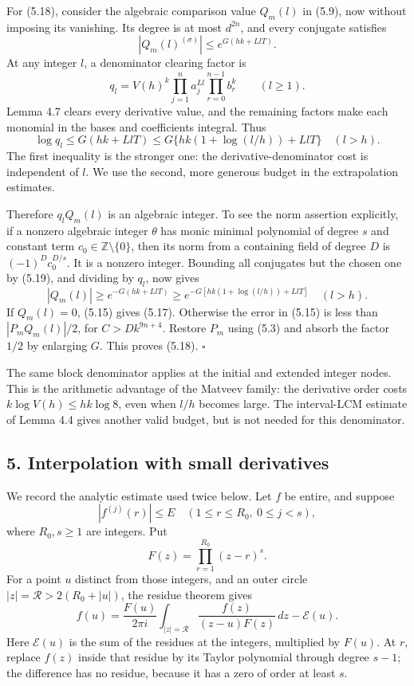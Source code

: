 \documentclass[
  11pt,
  a4paper,
]{article}
\begin{document}
For (5.18), consider the algebraic comparison value \(Q_m(l)\) in (5.9),
now without imposing its vanishing. Its degree is at most \(d^{2n}\),
and every conjugate satisfies \[
|Q_m(l)^{(\sigma)}|\le e^{G(hk+LlT)}. \tag{5.19}
\] At any integer \(l\), a denominator clearing factor is \[
q_l=V(h)^k
\prod_{j=1}^n a_j^{Ll}\prod_{r=0}^{n-1}b_r^k
\qquad(l\ge1).
\] Lemma 4.7 clears every derivative value, and the remaining factors
make each monomial in the bases and coefficients integral. Thus \[
\log q_l\le G(hk+LlT)
\le G\{hk(1+\log(l/h))+LlT\}\quad(l>h). \tag{5.20}
\] The first inequality is the stronger one: the derivative-denominator
cost is independent of \(l\). We use the second, more generous budget in
the extrapolation estimates.

Therefore \(q_lQ_m(l)\) is an algebraic integer. To see the norm
assertion explicitly, if a nonzero algebraic integer \(\theta\) has
monic minimal polynomial of degree \(s\) and constant term
\(c_0\in\mathbb Z\setminus\{0\}\), then its norm from a containing field
of degree \(D\) is \((-1)^{D}c_0^{D/s}\). It is a nonzero integer.
Bounding all conjugates but the chosen one by (5.19), and dividing by
\(q_l\), now gives \[
|Q_m(l)|\ge e^{-G(hk+LlT)}
\ge e^{-G[hk(1+\log(l/h))+LlT]}\quad(l>h).
\] If \(Q_m(l)=0\), (5.15) gives (5.17). Otherwise the error in (5.15)
is less than \(|P_mQ_m(l)|/2\), for \(C>Dk^{9n+4}\). Restore \(P_m\)
using (5.3) and absorb the factor \(1/2\) by enlarging \(G\). This
proves (5.18). \(\square\)

The same block denominator applies at the initial and extended integer
nodes. This is the arithmetic advantage of the Matveev family: the
derivative order costs \(k\log V(h)\le hk\log8\), even when \(l/h\)
becomes large. The interval-LCM estimate of Lemma 4.4 gives another
valid budget, but is not needed for this denominator.

\subsection{5. Interpolation with small
derivatives}\label{interpolation-with-small-derivatives}

We record the analytic estimate used twice below. Let \(f\) be entire,
and suppose \[
|f^{(j)}(r)|\le E
\quad(1\le r\le R_0,\ 0\le j<s),
\] where \(R_0,s\ge1\) are integers. Put \[
F(z)=\prod_{r=1}^{R_0}(z-r)^s.
\] For a point \(u\) distinct from those integers, and an outer circle
\(|z|=\mathcal R>2(R_0+|u|)\), the residue theorem gives \[
f(u)=\frac{F(u)}{2\pi i}\int_{|z|=\mathcal R}
\frac{f(z)}{(z-u)F(z)}\,dz-\mathcal E(u). \tag{5.21}
\] Here \(\mathcal E(u)\) is the sum of the residues at the integers,
multiplied by \(F(u)\). At \(r\), replace \(f(z)\) inside that residue
by its Taylor polynomial through degree \(s-1\); the difference has no
residue, because it has a zero of order at least \(s\).
\end{document}
